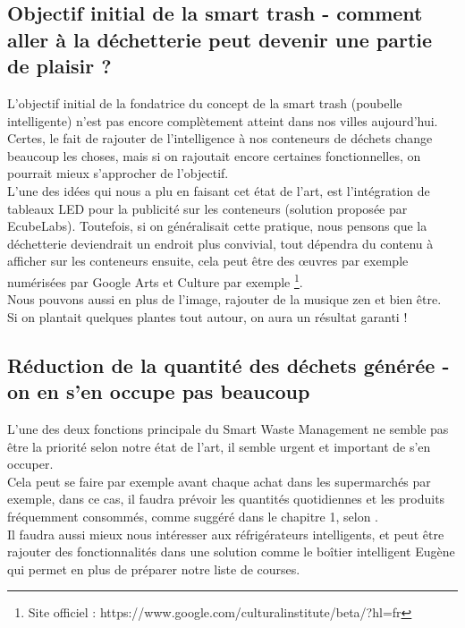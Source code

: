 \documentclass[a4paper,12pt]{report}
\begin{document}
\subsection{Objectif initial de la smart trash - comment aller à la déchetterie peut devenir une partie de plaisir ?}
L'objectif initial de la fondatrice du concept de la smart trash (poubelle intelligente) n'est pas encore complètement atteint dans nos villes aujourd'hui.\\ Certes, le fait de rajouter de l'intelligence à nos conteneurs de déchets change beaucoup les choses, mais si on rajoutait encore certaines fonctionnelles, on pourrait mieux s'approcher de l'objectif.\\
L'une des idées qui nous a plu en faisant cet état de l'art, est l'intégration de tableaux LED pour la publicité sur les conteneurs (solution proposée par EcubeLabs). Toutefois, si on généralisait cette pratique, nous pensons que la déchetterie deviendrait un endroit plus convivial, tout dépendra du contenu à afficher sur les conteneurs ensuite, cela peut être des œuvres par exemple numérisées par Google Arts et Culture par exemple \footnote{Site officiel : https://www.google.com/culturalinstitute/beta/?hl=fr}.\\
Nous pouvons aussi en plus de l'image, rajouter de la musique zen et bien être.\\
Si on plantait quelques plantes tout autour, on aura un résultat garanti !
\subsection{Réduction de la quantité des déchets générée - on en s'en occupe pas beaucoup}
L'une des deux fonctions principale du Smart Waste Management ne semble pas être la priorité selon notre état de l'art, il semble urgent et important de s'en occuper.\\
Cela peut se faire par exemple avant chaque achat dans les supermarchés par exemple, dans ce cas, il faudra prévoir les quantités quotidiennes et les produits fréquemment consommés, comme suggéré dans le chapitre 1, selon \cite{ref2}.\\
Il faudra aussi mieux nous intéresser aux réfrigérateurs intelligents, et peut être rajouter des fonctionnalités dans une solution comme le boîtier intelligent Eugène qui permet en plus de préparer notre liste de courses.
\end{document}
